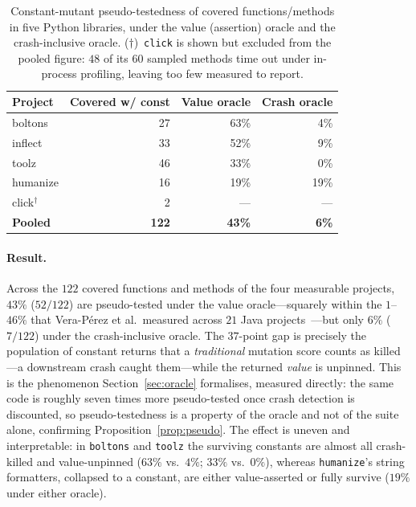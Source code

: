 \documentclass[runningheads,envcountsect,envcountsame]{llncs}
\begin{document}
\begin{table}[t]
\centering
\caption{Constant-mutant pseudo-testedness of covered functions/methods in five
Python libraries, under the value (assertion) oracle and the crash-inclusive
oracle. ($\dagger$)~\texttt{click} is shown but excluded from the pooled figure:
$48$ of its $60$ sampled methods time out under in-process profiling, leaving too
few measured to report.}
\label{tab:pseudo}
\begin{tabular}{@{}lrrr@{}}
\toprule
Project & Covered w/ const & Value oracle & Crash oracle \\
\midrule
boltons  & 27 & 63\% & 4\% \\
inflect  & 33 & 52\% & 9\% \\
toolz    & 46 & 33\% & 0\% \\
humanize & 16 & 19\% & 19\% \\
click$^\dagger$ & 2 & --- & --- \\
\midrule
\textbf{Pooled} & \textbf{122} & \textbf{43\%} & \textbf{6\%} \\
\bottomrule
\end{tabular}
\end{table}

\paragraph{Result.}
Across the $122$ covered functions and methods of the four measurable projects,
$43\%$ ($52/122$) are pseudo-tested under the value oracle---squarely within the
$1$--$46\%$ that Vera-P\'erez et al.\ measured across $21$ Java
projects~\cite{veraperez2018}---but only $6\%$ ($7/122$) under the crash-inclusive
oracle. The $37$-point gap is precisely the population of constant returns that a
\emph{traditional} mutation score counts as killed---a downstream crash caught
them---while the returned \emph{value} is unpinned. This is the phenomenon
Section~\ref{sec:oracle} formalises, measured directly: the same code is roughly
seven times more pseudo-tested once crash detection is discounted, so
pseudo-testedness is a property of the oracle and not of the suite alone,
confirming Proposition~\ref{prop:pseudo}. The effect is uneven and interpretable:
in \texttt{boltons} and \texttt{toolz} the surviving constants are almost all
crash-killed and value-unpinned ($63\%$ vs.\ $4\%$; $33\%$ vs.\ $0\%$), whereas
\texttt{humanize}'s string formatters, collapsed to a constant, are either
value-asserted or fully survive ($19\%$ under either oracle).
\end{document}
